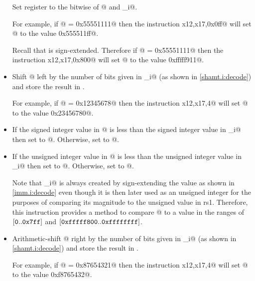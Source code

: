 \begin{itemize}
Set register \verb@rd@ to the bitwise \verb@or@ of @ and \verb@imm_i@.

For example, if @ = \verb@0x55551111@ then the instruction 
\verb@ori x12,x17,0x0ff@ will set @ to the value \verb@0x555511ff@.

Recall that \verb@imm@ is sign-extended.
Therefore if @ = \verb@0x55551111@ then the instruction 
\verb@ori x12,x17,0x800@ will set @ to the value \verb@0xfffff911@.

\item{}
\label{insn:slli}

Shift @ left by the number of bits given in \verb@shamt_i@ 
(as shown in \autoref{shamt.i:decode}) and store the result in \verb@rd@.

For example, if @ = \verb@0x12345678@ then the instruction 
\verb@slli x12,x17,4@ will set @ to the value \verb@0x23456780@.

\item{}
\label{insn:slti}

If the signed integer value in @ is less than the
signed integer value in \verb@imm_i@ then set \verb@rd@ to @.
Otherwise, set \verb@rd@ to @.

\item{}
\label{insn:sltiu}

If the unsigned integer value in @ is less than the
unsigned integer value in \verb@imm_i@ then set \verb@rd@ to @.
Otherwise, set \verb@rd@ to @.

Note that \verb@imm_i@ is always created by sign-extending the \verb@imm@ value 
as shown in \autoref{imm.i:decode} even though it is then later used as an unsigned 
integer for the purposes of comparing its magnitude to the unsigned value in rs1.  
Therefore, this instruction provides a method to compare @ to a value 
in the ranges of 
$[\text{\tt 0}..\text{\tt 0x7ff}]$ and $[\text{\tt 0xfffff800}..\text{\tt 0xffffffff}]$.

\item{}
\label{insn:srai}

Arithmetic-shift @ right by the number of bits given in \verb@shamt_i@
(as shown in \autoref{shamt.i:decode}) and store the result in \verb@rd@.

For example, if @ = \verb@0x87654321@ then the instruction 
\verb@srai x12,x17,4@ will set @ to the value \verb@0xf8765432@.


\end{itemize}
